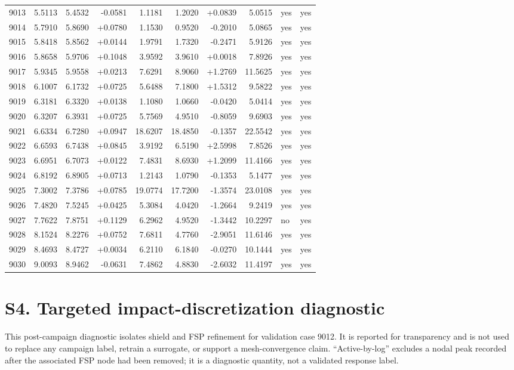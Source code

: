 \documentclass[11pt]{article}
\begin{document}
\begin{landscape}
\begin{longtable}{rrrrrrrrll}
9013 & 5.5113 & 5.4532 & -0.0581 & 1.1181 & 1.2020 & +0.0839 & 5.0515 & yes & yes \\
9014 & 5.7910 & 5.8690 & +0.0780 & 1.1530 & 0.9520 & -0.2010 & 5.0865 & yes & yes \\
9015 & 5.8418 & 5.8562 & +0.0144 & 1.9791 & 1.7320 & -0.2471 & 5.9126 & yes & yes \\
9016 & 5.8658 & 5.9706 & +0.1048 & 3.9592 & 3.9610 & +0.0018 & 7.8926 & yes & yes \\
9017 & 5.9345 & 5.9558 & +0.0213 & 7.6291 & 8.9060 & +1.2769 & 11.5625 & yes & yes \\
9018 & 6.1007 & 6.1732 & +0.0725 & 5.6488 & 7.1800 & +1.5312 & 9.5822 & yes & yes \\
9019 & 6.3181 & 6.3320 & +0.0138 & 1.1080 & 1.0660 & -0.0420 & 5.0414 & yes & yes \\
9020 & 6.3207 & 6.3931 & +0.0725 & 5.7569 & 4.9510 & -0.8059 & 9.6903 & yes & yes \\
9021 & 6.6334 & 6.7280 & +0.0947 & 18.6207 & 18.4850 & -0.1357 & 22.5542 & yes & yes \\
9022 & 6.6593 & 6.7438 & +0.0845 & 3.9192 & 6.5190 & +2.5998 & 7.8526 & yes & yes \\
9023 & 6.6951 & 6.7073 & +0.0122 & 7.4831 & 8.6930 & +1.2099 & 11.4166 & yes & yes \\
9024 & 6.8192 & 6.8905 & +0.0713 & 1.2143 & 1.0790 & -0.1353 & 5.1477 & yes & yes \\
9025 & 7.3002 & 7.3786 & +0.0785 & 19.0774 & 17.7200 & -1.3574 & 23.0108 & yes & yes \\
9026 & 7.4820 & 7.5245 & +0.0425 & 5.3084 & 4.0420 & -1.2664 & 9.2419 & yes & yes \\
9027 & 7.7622 & 7.8751 & +0.1129 & 6.2962 & 4.9520 & -1.3442 & 10.2297 & no & yes \\
9028 & 8.1524 & 8.2276 & +0.0752 & 7.6811 & 4.7760 & -2.9051 & 11.6146 & yes & yes \\
9029 & 8.4693 & 8.4727 & +0.0034 & 6.2110 & 6.1840 & -0.0270 & 10.1444 & yes & yes \\
9030 & 9.0093 & 8.9462 & -0.0631 & 7.4862 & 4.8830 & -2.6032 & 11.4197 & yes & yes \\
\bottomrule
\end{longtable}
\normalsize
\end{landscape}
\clearpage
\section*{S4. Targeted impact-discretization diagnostic}
This post-campaign diagnostic isolates shield and FSP refinement for validation case 9012. It is reported for transparency and is not used to replace any campaign label, retrain a surrogate, or support a mesh-convergence claim. ``Active-by-log'' excludes a nodal peak recorded after the associated FSP node had been removed; it is a diagnostic quantity, not a validated response label.
\end{document}
